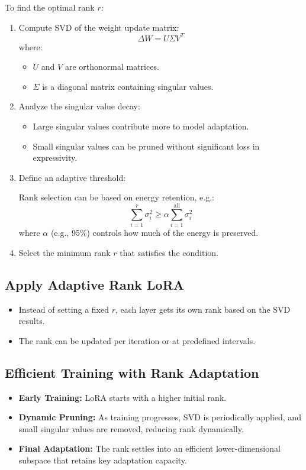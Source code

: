 \documentclass{article}
\begin{document}
To find the optimal rank $r$:
\begin{enumerate}
    \item Compute SVD of the weight update matrix:
    \begin{equation}
        \Delta W = U \Sigma V^T
    \end{equation}
    where:
    \begin{itemize}
        \item $U$ and $V$ are orthonormal matrices.
        \item $\Sigma$ is a diagonal matrix containing singular values.
    \end{itemize}
    \item Analyze the singular value decay:
    \begin{itemize}
        \item Large singular values contribute more to model adaptation.
        \item Small singular values can be pruned without significant loss in expressivity.
    \end{itemize}
    \item Define an adaptive threshold:
    
    Rank selection can be based on energy retention, e.g.:
    \begin{equation}
        \sum_{i=1}^{r} \sigma_i^2 \geq \alpha \sum_{i=1}^{\text{all}} \sigma_i^2
    \end{equation}
    where $\alpha$ (e.g., 95\%) controls how much of the energy is preserved.
    \item Select the minimum rank $r$ that satisfies the condition.
\end{enumerate}

\subsection{Apply Adaptive Rank LoRA}
\begin{itemize}
    \item Instead of setting a fixed $r$, each layer gets its own rank based on the SVD results.
    \item The rank can be updated per iteration or at predefined intervals.
\end{itemize}

\subsection{Efficient Training with Rank Adaptation}
\begin{itemize}
    \item \textbf{Early Training:} LoRA starts with a higher initial rank.
    \item \textbf{Dynamic Pruning:} As training progresses, SVD is periodically applied, and small singular values are removed, reducing rank dynamically.
    \item \textbf{Final Adaptation:} The rank settles into an efficient lower-dimensional subspace that retains key adaptation capacity.
\end{itemize}
\end{document}

